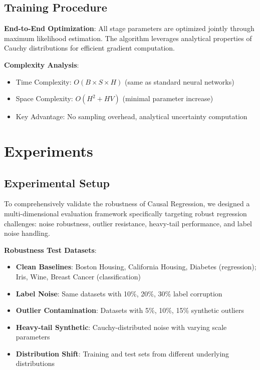 \documentclass[conference]{IEEEtran}
\begin{document}
\subsection{Training Procedure}

\textbf{End-to-End Optimization}: All stage parameters are optimized jointly through maximum likelihood estimation. The algorithm leverages analytical properties of Cauchy distributions for efficient gradient computation.

\textbf{Complexity Analysis}:
\begin{itemize}
\item Time Complexity: $O(B \times S \times H)$ (same as standard neural networks)
\item Space Complexity: $O(H^2 + HV)$ (minimal parameter increase)
\item Key Advantage: No sampling overhead, analytical uncertainty computation
\end{itemize}

\section{Experiments}
\label{sec:experiments}

\subsection{Experimental Setup}

To comprehensively validate the robustness of Causal Regression, we designed a multi-dimensional evaluation framework specifically targeting robust regression challenges: noise robustness, outlier resistance, heavy-tail performance, and label noise handling.

\textbf{Robustness Test Datasets}:
\begin{itemize}
\item \textbf{Clean Baselines}: Boston Housing, California Housing, Diabetes (regression); Iris, Wine, Breast Cancer (classification)
\item \textbf{Label Noise}: Same datasets with 10\%, 20\%, 30\% label corruption
\item \textbf{Outlier Contamination}: Datasets with 5\%, 10\%, 15\% synthetic outliers
\item \textbf{Heavy-tail Synthetic}: Cauchy-distributed noise with varying scale parameters
\item \textbf{Distribution Shift}: Training and test sets from different underlying distributions
\end{itemize}
\end{document}
